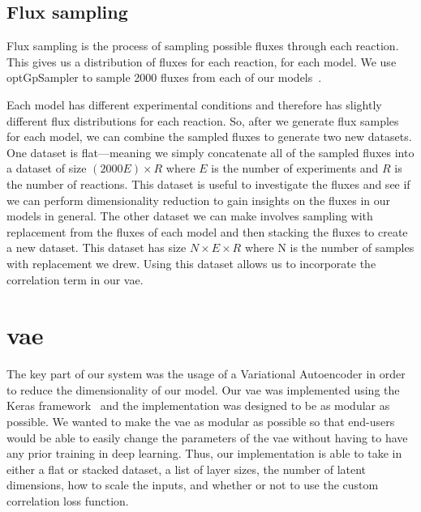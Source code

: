 \subsection{Flux sampling}
Flux sampling is the process of sampling possible fluxes through each reaction.
This gives us a distribution of fluxes for each reaction, for each model.
We use optGpSampler to sample 2000 fluxes from each of our models~\cite{megchelenbrink2014optgpsampler}.


Each model has different experimental conditions and therefore has slightly different flux distributions for each reaction.
So, after we generate flux samples for each model, we can combine the sampled fluxes to generate two new datasets.
One dataset is flat---meaning we simply concatenate all of the sampled fluxes into a dataset of size $(2000E) \times R$ where $E$ is the number of experiments and $R$ is the number of reactions.
This dataset is useful to investigate the fluxes and see if we can perform dimensionality reduction to gain insights on the fluxes in our models in general.
The other dataset we can make involves sampling with replacement from the fluxes of each model and then stacking the fluxes to create a new dataset.
This dataset has size $N \times E \times R$ where N is the number of samples with replacement we drew.
Using this dataset allows us to incorporate the correlation term in our \gls{vae}.

\section{\gls{vae}}
The key part of our system was the usage of a Variational Autoencoder in order to reduce the dimensionality of our model.
Our \gls{vae} was implemented using the Keras framework~\cite{chollet2015keras} and the implementation was designed to be as modular as possible.
We wanted to make the \gls{vae} as modular as possible so that end-users would be able to easily change the parameters of the \gls{vae} without having to have any prior training in deep learning.
Thus, our implementation is able to take in either a flat or stacked dataset, a list of layer sizes, the number of latent dimensions, how to scale the inputs, and whether or not to use the custom correlation loss function.

